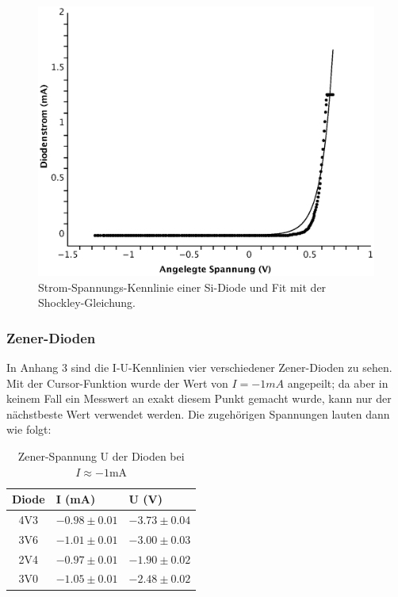\documentclass[12pt,a4paper,twopage]{article}
\begin{document}
\begin{center}
\begin{figure}[H]
\includegraphics[scale=0.8]{shockley.eps}
\caption{Strom-Spannungs-Kennlinie einer Si-Diode und Fit mit der Shockley-Gleichung.}
\label{fig:shockley}
\end{figure}
\end{center}


\subsubsection{Zener-Dioden}
In Anhang 3 sind die I-U-Kennlinien vier verschiedener Zener-Dioden zu sehen. Mit der Cursor-Funktion wurde der Wert von $I=-1\si{mA}$ angepeilt; da aber in keinem Fall ein Messwert an exakt diesem Punkt gemacht wurde, kann nur der nächstbeste Wert verwendet werden. Die zugehörigen Spannungen lauten dann wie folgt:

\begin{table}[H]
\centering
\begin{tabular}{|c||l|l|}
\hline
Diode & I (mA) & U (V)\\
\hline
4V3 & $-0.98 \pm 0.01$ & $-3.73 \pm 0.04$\\
3V6 & $-1.01 \pm 0.01$ & $-3.00 \pm 0.03$\\
2V4 & $-0.97 \pm 0.01$ & $-1.90 \pm 0.02$\\
3V0 & $-1.05 \pm 0.01$ & $-2.48 \pm 0.02$\\
\hline
\end{tabular}
\caption{Zener-Spannung U der Dioden bei $I\approx -1$mA}
\end{table}
\end{document}
